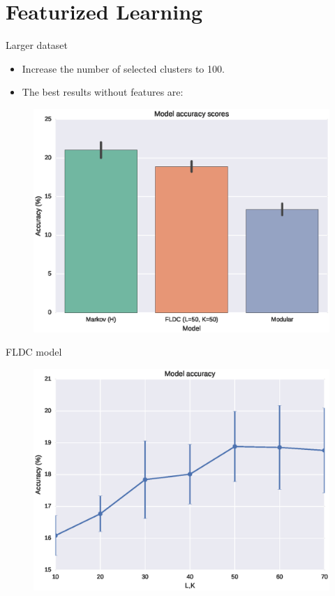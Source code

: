 \documentclass{beamer}
\begin{document}
\section{Featurized Learning}

\begin{frame}{Larger dataset}
  \begin{itemize}
    \item Increase the number of selected clusters to 100.
    \item The best results without features are:
  \end{itemize}
  \begin{figure}
    \centering
    \includegraphics[height=0.5\textheight]{score_100_no_singles_no_features}
  \end{figure}
\end{frame}

\begin{frame}{FLDC model}
  \begin{figure}
    \centering
    \includegraphics[height=0.8\textheight]{score_100_no_singles_no_features_dim}
  \end{figure}
\end{frame}
\end{document}
